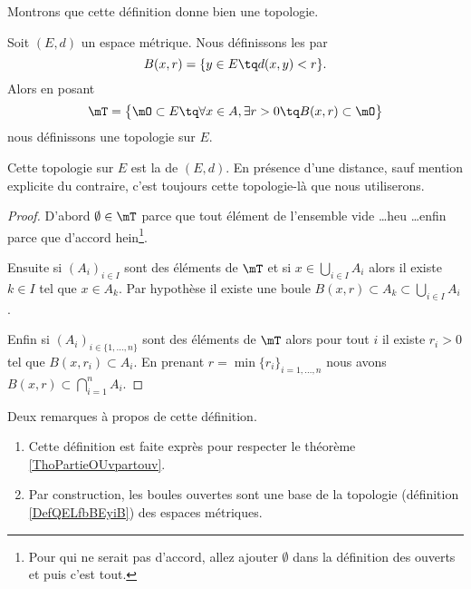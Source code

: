 Montrons que cette définition donne bien une topologie.
\begin{theoremDef}     \label{ThoORdLYUu}
    Soit \( (E,d)\) un espace métrique. Nous définissons les  par
    \begin{equation}
        B(x,r)=\{ y\in E\tq d(x,y)<r \}.
    \end{equation}
    Alors en posant
    \begin{equation}        \label{EqGDVVooDZfwSf}
        \mT=\big\{  \mO\subset E  \tq\forall x\in A,\exists r>0\tq B(x,r)\subset \mO \big\}
    \end{equation}
    nous définissons une topologie sur \( E\).

    Cette topologie sur \( E\) est la  de \( (E,d)\). En présence d'une distance, sauf mention explicite du contraire, c'est toujours cette topologie-là que nous utiliserons.
\end{theoremDef}

\begin{proof}
    D'abord \( \emptyset\in\mT\) parce que tout élément de l'ensemble vide \ldots heu \ldots enfin parce que d'accord hein\footnote{Pour qui ne serait pas d'accord, allez ajouter \( \emptyset\) dans la définition des ouverts et puis c'est tout.}.

    Ensuite si \( (A_i)_{i\in I}\) sont des éléments de \( \mT\) et si \( x\in\bigcup_{i\in I}A_i\) alors il existe \( k\in I\) tel que \( x\in A_k\). Par hypothèse il existe une boule \( B(x,r)\subset A_k\subset\bigcup_{i\in I}A_i\).

    Enfin si \( (A_i)_{i\in\{ 1,\ldots, n \}}\) sont des éléments de \( \mT\) alors pour tout \( i\) il existe \( r_i>0\) tel que \( B(x,r_i)\subset A_i\). En prenant \( r=\min\{ r_i \}_{i=1,\ldots, n}\) nous avons $B(x,r)\subset\bigcap_{i=1}^nA_i.$
\end{proof}

\begin{remark}  \label{RemQDRooKnwKk}
    Deux remarques à propos de cette définition.
    \begin{enumerate}
        \item
    Cette définition est faite exprès pour respecter le théorème \ref{ThoPartieOUvpartouv}.
\item
    Par construction, les boules ouvertes sont une base de la topologie (définition \ref{DefQELfbBEyiB}) des espaces métriques.
    \end{enumerate}
\end{remark}

